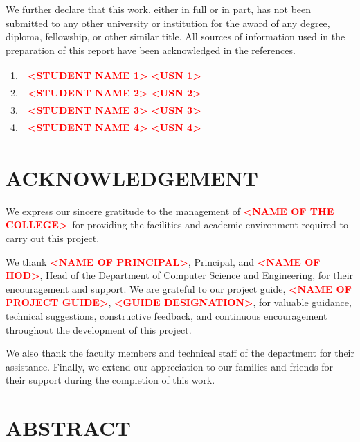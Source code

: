 \documentclass[12pt,a4paper,oneside]{report}
\newcommand{\college}{\placeholder{NAME OF THE COLLEGE}}
\newcommand{\department}{Department of Computer Science and Engineering}
\newcommand{\guide}{\placeholder{NAME OF PROJECT GUIDE}}
\newcommand{\guideDesignation}{\placeholder{GUIDE DESIGNATION}}
\newcommand{\hod}{\placeholder{NAME OF HOD}}
\newcommand{\principal}{\placeholder{NAME OF PRINCIPAL}}
\newcommand{\placeholder}[1]{\textbf{\textcolor{red}{\textless #1\textgreater}}}
\begin{document}
We further declare that this work, either in full or in part, has not been submitted to any other university or institution for the award of any degree, diploma, fellowship, or other similar title. All sources of information used in the preparation of this report have been acknowledged in the references.

\vspace{0.6in}
\begin{flushright}
\begin{tabular}{ll}
1. & \placeholder{STUDENT NAME 1} \quad \placeholder{USN 1}\\[8pt]
2. & \placeholder{STUDENT NAME 2} \quad \placeholder{USN 2}\\[8pt]
3. & \placeholder{STUDENT NAME 3} \quad \placeholder{USN 3}\\[8pt]
4. & \placeholder{STUDENT NAME 4} \quad \placeholder{USN 4}
\end{tabular}
\end{flushright}

\clearpage

\chapter*{ACKNOWLEDGEMENT}

We express our sincere gratitude to the management of \college\ for providing the facilities and academic environment required to carry out this project.

We thank \principal, Principal, and \hod, Head of the \department, for their encouragement and support. We are grateful to our project guide, \guide, \guideDesignation, for valuable guidance, technical suggestions, constructive feedback, and continuous encouragement throughout the development of this project.

We also thank the faculty members and technical staff of the department for their assistance. Finally, we extend our appreciation to our families and friends for their support during the completion of this work.

\clearpage

\chapter*{ABSTRACT}
\end{document}
